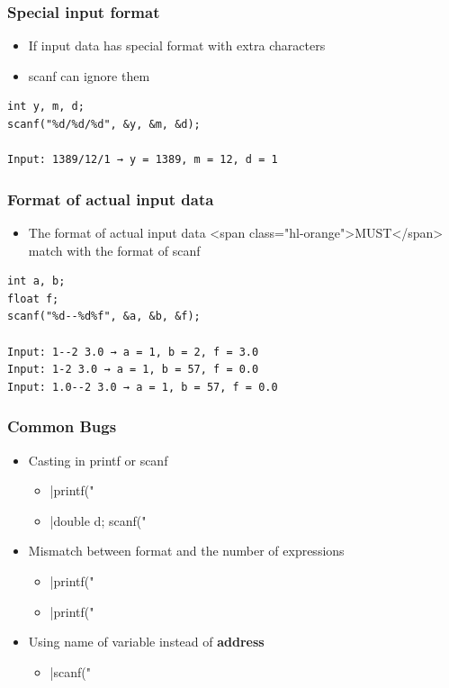 \documentclass{../c-lecture}
\begin{document}
\begin{frame}[fragile]
  \frametitle{Special input format}
  \begin{itemize}
    \item If input data has special format with extra characters
    \item scanf can ignore them
  \end{itemize}
  \begin{verbatim}
int y, m, d;
scanf("%d/%d/%d", &y, &m, &d);

Input: 1389/12/1 → y = 1389, m = 12, d = 1
  \end{verbatim}
\end{frame}

\begin{frame}[fragile]
  \frametitle{Format of actual input data}
  \begin{itemize}
    \item
      The format of actual input data <span class="hl-orange">MUST</span> match
      with the format of scanf

  \end{itemize}
  \begin{verbatim}
int a, b;
float f;
scanf("%d--%d%f", &a, &b, &f);

Input: 1--2 3.0 → a = 1, b = 2, f = 3.0
Input: 1-2 3.0 → a = 1, b = 57, f = 0.0
Input: 1.0--2 3.0 → a = 1, b = 57, f = 0.0
  \end{verbatim}
\end{frame}

\begin{frame}[fragile]
  \frametitle{Common Bugs}
  \begin{itemize}
    \item Casting in printf or scanf
    \begin{itemize}
      \item {}|printf("%
      \item {}|double d; scanf("%
    \end{itemize}
    \item Mismatch between format and the number of expressions
    \begin{itemize}
      \item {}|printf("%
      \item {}|printf("%
    \end{itemize}
    \item
      Using name of variable instead of \textbf{\color{Orange} address}
    \begin{itemize}
      \item {}|scanf("%
    \end{itemize}
  \end{itemize}
\end{frame}
\end{document}
